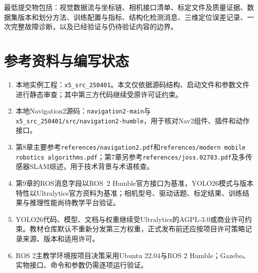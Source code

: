 \documentclass[UTF8,zihao=-4]{ctexart}
\DeclareRobustCommand{\code}[1]{\texttt{#1}}
\begin{document}
最低提交物包括：视觉数据流与坐标链、相机接口清单、标定文件及质量证据、数据集版本和划分方法、训练配置与指标、结构化检测消息、三维定位误差记录、一次完整故障诊断，以及已经验证与仍待验证内容的边界。

\section*{参考资料与编写状态}

\begin{enumerate}
  \item 本地实例工程：\code{x5\_src\_250401}。本文仅依据源码结构、启动文件和参数文件进行静态审查；其中第三方代码继续受原许可证约束。
  \item 本地Navigation2源码：\code{navigation2-main}与\code{x5\_src\_250401/src/navigation2-humble}，用于核对Nav2组件、插件和动作接口。
  \item 第8章主要参考\code{references/navigation2.pdf}和\code{references/modern mobile robotics algorithms.pdf}；第7章另参考\code{references/joss.02783.pdf}及多传感器SLAM综述，用于技术背景与术语核查。
  \item 第9章的ROS消息字段以ROS~2 Humble官方接口为基准，YOLO26模式与版本特性以Ultralytics官方资料为基准；相机型号、驱动话题、标定结果、训练结果与推理性能尚待教学平台验证。
  \item YOLO26代码、模型、文档与权重继续受Ultralytics的AGPL-3.0或商业许可约束。教材仓库默认不重新分发第三方权重，正式发布前还应按项目许可策略记录来源、版本和适用许可。
  \item ROS 2主教学环境按项目决策采用Ubuntu 22.04与ROS 2 Humble；Gazebo、实物接口、命令和参数仍需逐项运行验证。
\end{enumerate}
\end{document}
